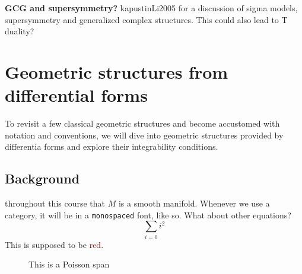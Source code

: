 \documentclass{tufte-book}
\newcommand{\hlred}[1]{\textcolor{Maroon}{#1}}%
\newcommand{\doccls}[1]{\texttt{#1}}%
\begin{document}
\lb
{ \bf GCG and supersymmetry?}
kapustinLi2005 for a discussion of sigma models, supersymmetry and generalized
complex structures.
This could also lead to T duality?






















\chapter{Geometric structures from differential forms}
\label{ch:ZT1VUV}

To revisit a few classical geometric structures and become accustomed with
notation and conventions, we will dive into geometric structures provided by differentia forms
and explore their integrability conditions.

\section{Background}

 throughout this course that $M$ is a smooth manifold. 
Whenever we use a category, it will be in a \texttt{monospaced} font, like so.
What about other equations?
$$\sum _{i = 0} i^{2}$$
This is supposed to be \hlred{red}.


\begin{figure}
    \centering
    \caption{This is a Poisson span}
    \label{fig:NIYJS9}
\end{figure}
\end{document}

